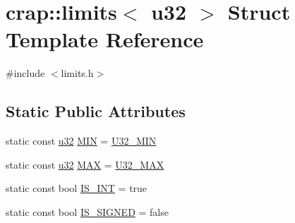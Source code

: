 \hypertarget{structcrap_1_1limits_3_01u32_01_4}{\section{crap\-:\-:limits$<$ u32 $>$ Struct Template Reference}
\label{structcrap_1_1limits_3_01u32_01_4}
}


{\ttfamily \#include $<$limits.\-h$>$}

\subsection*{Static Public Attributes}
\begin{DoxyCompactItemize}
\item 
static const \hyperlink{types_8h_afaa62991928fb9fb18ff0db62a040aba}{u32} \hyperlink{structcrap_1_1limits_3_01u32_01_4_ae7af50ad2958496a562f706a503b29db}{M\-I\-N} = \hyperlink{types_8h_ad0d6d592d964acd9de17674242bf2707}{U32\-\_\-\-M\-I\-N}
\item 
static const \hyperlink{types_8h_afaa62991928fb9fb18ff0db62a040aba}{u32} \hyperlink{structcrap_1_1limits_3_01u32_01_4_ab5ece5bb1f3672fc9eeb021079b0ea43}{M\-A\-X} = \hyperlink{types_8h_a4028a1a55fd7b907a44c48d5ca42d6a6}{U32\-\_\-\-M\-A\-X}
\item 
static const bool \hyperlink{structcrap_1_1limits_3_01u32_01_4_a61391851a0c427911b85d1f820749120}{I\-S\-\_\-\-I\-N\-T} = true
\item 
static const bool \hyperlink{structcrap_1_1limits_3_01u32_01_4_a4f3d08b60760db3e899e50e86f2c67b5}{I\-S\-\_\-\-S\-I\-G\-N\-E\-D} = false
\end{DoxyCompactItemize}


